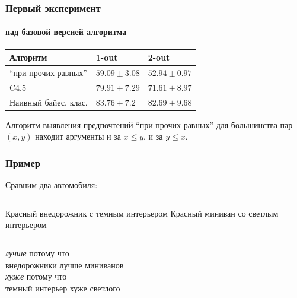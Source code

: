\documentclass[xcolor=table]{beamer}
\theoremstyle{definition}
\begin{document}
	\begin{frame}
		\frametitle{Первый эксперимент}
		\framesubtitle{над базовой версией алгоритма}
		\begin{center}
			\begin{tabular}{|l|ll|}
				\hline
				Алгоритм             & 1-out & 2-out \\ \hline
				\enquote{при прочих равных}      & $59.09 \pm 3.08$ & $52.94 \pm 0.97$ \\
				C4.5                 & $79.91 \pm 7.29$ & $71.61 \pm 8.97$ \\
				Наивный байес. клас. & $83.76 \pm 7.2$ & $82.69 \pm 9.68$ \\ \hline
			\end{tabular}
		\end{center}
		
		\vspace{1.5em}
		Алгоритм выявления предпочтений \enquote{при прочих равных} для большинства пар $(x,y)$ находит аргументы и за $x \leq y$, и за $y \leq x$.
	\end{frame}
	
	\begin{frame}
		\frametitle{Пример}
		\begin{center}
			Сравним два автомобиля:
		\end{center}
		\begin{columns}[c] 
			\column{.5\textwidth} 
			Красный внедорожник с темным интерьером
	    	\column{.5\textwidth}
	    	Красный миниван со светлым интерьером
		\end{columns}
		\begin{center}
			\vspace{2em}
			\emph{лучше} потому что \\внедорожники лучше миниванов \\
			\vspace{2em}
			\emph{хуже} потому что \\темный интерьер хуже светлого 
		\end{center}
	\end{frame}
	
\end{document}
